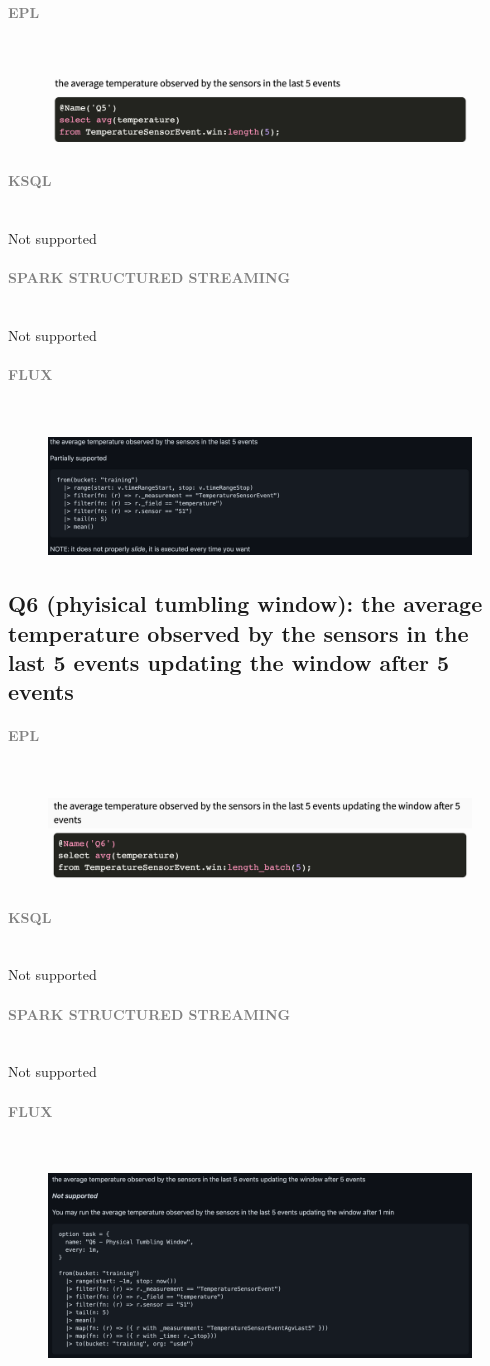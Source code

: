 \documentclass[10pt,a4paper]{article}
\newcommand{\myparagraph}[1]{\paragraph{\normalsize{\textcolor{gray}{\uppercase{\textbf{#1}}}} }\mbox{} \vspace{0.5em}\\}
\begin{document}
\myparagraph{EPL}
\begin{figure}[h!]
 \hfill \includegraphics[width=400pt]{images/epl_Q5}\hspace*{\fill}
\end{figure}
\myparagraph{KSQL}
Not supported
\myparagraph{Spark Structured Streaming}
Not supported
\myparagraph{Flux}
\begin{figure}[h!]
 \hfill \includegraphics[width=400pt]{images/flux_Q5}\hspace*{\fill}
\end{figure}

\pagebreak

\subsection{Q6 (phyisical tumbling window): the average temperature observed by the sensors in the last 5 events updating the window after 5 events}

\myparagraph{EPL}
\begin{figure}[h!]
 \hfill \includegraphics[width=400pt]{images/epl_Q6}\hspace*{\fill}
\end{figure}
\myparagraph{KSQL}
Not supported
\myparagraph{Spark Structured Streaming}
Not supported
\myparagraph{Flux}
\begin{figure}[h!]
 \hfill \includegraphics[width=400pt]{images/flux_Q6}\hspace*{\fill}
\end{figure}
\end{document}
